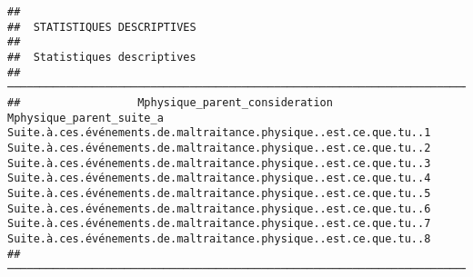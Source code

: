 \documentclass[
]{article}
\begin{document}
\begin{verbatim}
## 
##  STATISTIQUES DESCRIPTIVES
## 
##  Statistiques descriptives                                                                                                                                                                                                                                                                                                                                                                                                                                                                                                                                                                                                                            
##  ──────────────────────────────────────────────────────────────────────────────────────────────────────────────────────────────────────────────────────────────────────────────────────────────────────────────────────────────────────────────────────────────────────────────────────────────────────────────────────────────────────────────────────────────────────────────────────────────────────────────────────────────────────────────────────────────────────────────────────────────────────────────────────────────────────────────────────────────────────────────────────────────────────────────────────────────────────────────────── 
##                  Mphysique_parent_consideration    Mphysique_parent_suite_a    Suite.à.ces.événements.de.maltraitance.physique..est.ce.que.tu..1    Suite.à.ces.événements.de.maltraitance.physique..est.ce.que.tu..2    Suite.à.ces.événements.de.maltraitance.physique..est.ce.que.tu..3    Suite.à.ces.événements.de.maltraitance.physique..est.ce.que.tu..4    Suite.à.ces.événements.de.maltraitance.physique..est.ce.que.tu..5    Suite.à.ces.événements.de.maltraitance.physique..est.ce.que.tu..6    Suite.à.ces.événements.de.maltraitance.physique..est.ce.que.tu..7    Suite.à.ces.événements.de.maltraitance.physique..est.ce.que.tu..8   
##  ──────────────────────────────────────────────────────────────────────────────────────────────────────────────────────────────────────────────────────────────────────────────────────────────────────────────────────────────────────────────────────────────────────────────────────────────────────────────────────────────────────────────────────────────────────────────────────────────────────────────────────────────────────────────────────────────────────────────────────────────────────────────────────────────────────────────────────────────────────────────────────────────────────────────────────────────────────────────────── 

\end{verbatim}
\end{document}
